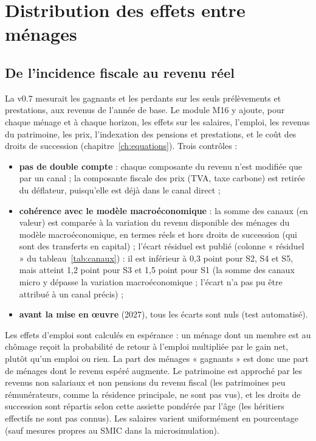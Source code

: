 \chapter{Distribution des effets entre ménages}\label{ch:distribution}

\section{De l'incidence fiscale au revenu réel}

La v0.7 mesurait les gagnants et les perdants sur les seuls prélèvements et prestations, aux revenus de l'année de
base. Le module M16 y ajoute, pour chaque ménage et à chaque horizon, les effets sur les salaires, l'emploi, les
revenus du patrimoine, les prix, l'indexation des pensions et prestations, et le coût des droits de succession
(chapitre~\ref{ch:equations}). Trois contrôles :
\begin{itemize}
\item \textbf{pas de double compte} : chaque composante du revenu n'est modifiée que par un canal ; la composante
fiscale des prix (TVA, taxe carbone) est retirée du déflateur, puisqu'elle est déjà dans le canal direct ;
\item \textbf{cohérence avec le modèle macroéconomique} : la somme des canaux (en valeur) est comparée à la variation du
revenu disponible des ménages du modèle macroéconomique, en termes réels et hors droits de succession (qui sont des
transferts en capital) ; l'écart résiduel est publié (colonne « résiduel » du tableau~\ref{tab:canaux}) : il est
inférieur à 0,3 point pour S2, S4 et S5, mais atteint 1,2 point pour S3 et 1,5 point pour S1 (la somme des canaux
micro y dépasse la variation macroéconomique ; l'écart n'a pas pu être attribué à un canal précis) ;
\item \textbf{avant la mise en œuvre} (2027), tous les écarts sont nuls (test automatisé).
\end{itemize}

\begin{limites}
Les effets d'emploi sont calculés en espérance : un ménage dont un membre est au chômage reçoit la probabilité de
retour à l'emploi multipliée par le gain net, plutôt qu'un emploi ou rien. La part des ménages « gagnants » est donc
une part de ménages dont le revenu espéré augmente. Le patrimoine est approché par les revenus non salariaux et non
pensions du revenu fiscal (les patrimoines peu rémunérateurs, comme la résidence principale, ne sont pas vus), et les
droits de succession sont répartis selon cette assiette pondérée par l'âge (les héritiers effectifs ne sont pas
connus). Les salaires varient uniformément en pourcentage (sauf mesures propres au SMIC dans la microsimulation).
\end{limites}

